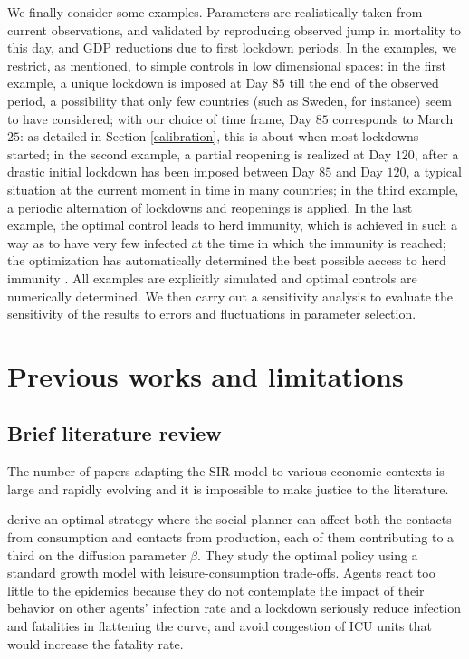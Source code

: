 \documentclass{amsart}
\begin{document}
We finally consider some examples. Parameters are realistically
taken from current observations, and validated
by reproducing observed jump in mortality to this day,
and 
GDP reductions due to first lockdown periods. 
In the examples, we restrict, as mentioned, to
 simple controls in low dimensional spaces: 
 in the first example, a unique  lockdown is imposed
 at Day $85$
 till the end of the observed period, 
 a possibility that only few countries (such as Sweden, for instance)
 seem to have considered; with our choice of time frame,
 Day $85$ corresponds to March $25$: as detailed
 in Section \ref{calibration}, this is about when most lockdowns started; 
 in the second example, a partial reopening is realized 
 at Day $120$, after a
drastic initial lockdown has been imposed between Day 
$85$ and Day $120$, a typical situation at the current moment in time
in many countries;
in the third example, 
 a periodic alternation of lockdowns and reopenings
 is applied. In the last example, the optimal control 
 leads to herd immunity, which  is achieved 
 in such a way as to have
  very few infected at the time in which
 the immunity is reached;  the optimization has
 automatically determined the best possible
 access to herd immunity
  \cite{BM}. All examples are explicitly simulated and 
 optimal controls are numerically determined. 
 We then carry out a sensitivity analysis
 to evaluate the sensitivity of the results to 
 errors and fluctuations in parameter selection.
 
\color{black}
\section{Previous works and limitations}
\subsection{Brief literature review} \label{LitRev}

The number of papers adapting the SIR model to various economic contexts is large and rapidly evolving and it is impossible to make justice to the literature.

\cite{jones2020optimal} derive an optimal strategy where the social planner can affect both the contacts from consumption and contacts from production, each of them contributing to a third on the diffusion parameter $\beta$. They study the optimal policy using a standard growth model with leisure-consumption trade-offs. Agents react too little to the epidemics because they do not contemplate the impact of their behavior on other agents' infection rate and a lockdown seriously reduce infection and fatalities in flattening the curve, and avoid congestion of ICU units that would increase the fatality rate.
\end{document}
